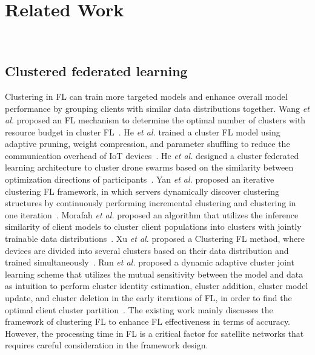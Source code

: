 \section{Related Work}
~\label{sec:relatedwork}
\subsection{Clustered federated learning}
Clustering in FL can train more targeted models and enhance overall model performance by grouping clients with similar data distributions together. Wang \textit{et al.} proposed an FL mechanism to determine the optimal number of clusters with resource budget in cluster FL~\cite {WangTMC22}. He \textit{et al.} trained a cluster FL model using adaptive pruning, weight compression, and parameter shuffling to reduce the communication overhead of IoT devices~\cite {HeIOT24}. He \textit{et al.} designed a cluster federated learning architecture to cluster drone swarms based on the similarity between optimization directions of participants~\cite {HeTVT23}. Yan \textit{et al.} proposed an iterative clustering FL framework, in which servers dynamically discover clustering structures by continuously performing incremental clustering and clustering in one iteration~\cite{YanTNNLS23}. Morafah \textit{et al.} proposed an algorithm that utilizes the inference similarity of client models to cluster client populations into clusters with jointly trainable data distributions~\cite{MorafahOJCS23}. Xu \textit{et al.} proposed a Clustering FL method, where devices are divided into several clusters based on their data distribution and trained simultaneously~\cite{XuIOT24}. 
Run \textit{et al.} proposed a dynamic adaptive cluster joint learning scheme that utilizes the mutual sensitivity between the model and data as intuition to perform cluster identity estimation, cluster addition, cluster model update, and cluster deletion in the early iterations of FL, in order to find the optimal client cluster partition~\cite{RunKBS23}.
The existing work mainly discusses the framework of clustering FL to enhance FL effectiveness in terms of accuracy. 
However, the processing time in FL is a critical factor for satellite networks that requires careful consideration in the framework design.



